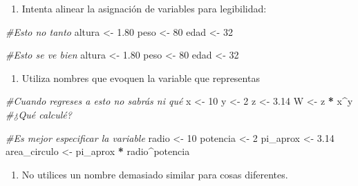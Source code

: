 \documentclass[
]{book}
\newenvironment{Shaded}{\begin{snugshade}}{\end{snugshade}}
\newcommand{\CommentTok}[1]{\textcolor[rgb]{0.56,0.35,0.01}{\textit{#1}}}
\newcommand{\DecValTok}[1]{\textcolor[rgb]{0.00,0.00,0.81}{#1}}
\newcommand{\FloatTok}[1]{\textcolor[rgb]{0.00,0.00,0.81}{#1}}
\newcommand{\NormalTok}[1]{#1}
\newcommand{\OperatorTok}[1]{\textcolor[rgb]{0.81,0.36,0.00}{\textbf{#1}}}
\newcommand{\StringTok}[1]{\textcolor[rgb]{0.31,0.60,0.02}{#1}}
\providecommand{\tightlist}{%
  \setlength{\itemsep}{0pt}\setlength{\parskip}{0pt}}
\begin{document}
\begin{enumerate}
\def\labelenumi{\arabic{enumi}.}
\setcounter{enumi}{2}
\tightlist
\item
  Intenta alinear la asignación de variables para legibilidad:
\end{enumerate}

\begin{Shaded}
\begin{Highlighting}[]
\CommentTok{#Esto no tanto}
\NormalTok{altura <-}\StringTok{ }\FloatTok{1.80}
\NormalTok{peso <-}\StringTok{ }\DecValTok{80}
\NormalTok{edad <-}\StringTok{ }\DecValTok{32}

\CommentTok{#Esto se ve bien}
\NormalTok{altura <-}\StringTok{ }\FloatTok{1.80}
\NormalTok{peso   <-}\StringTok{ }\DecValTok{80}
\NormalTok{edad   <-}\StringTok{ }\DecValTok{32}
\end{Highlighting}
\end{Shaded}

\begin{enumerate}
\def\labelenumi{\arabic{enumi}.}
\setcounter{enumi}{3}
\tightlist
\item
  Utiliza nombres que evoquen la variable que representas
\end{enumerate}

\begin{Shaded}
\begin{Highlighting}[]
\CommentTok{#Cuando regreses a esto no sabrás ni qué}
\NormalTok{x <-}\StringTok{ }\DecValTok{10}
\NormalTok{y <-}\StringTok{ }\DecValTok{2}
\NormalTok{z <-}\StringTok{ }\FloatTok{3.14}
\NormalTok{W <-}\StringTok{ }\NormalTok{z }\OperatorTok{*}\StringTok{ }\NormalTok{x}\OperatorTok{^}\NormalTok{y }\CommentTok{#¿Qué calculé?}

\CommentTok{#Es mejor especificar la variable}
\NormalTok{radio        <-}\StringTok{ }\DecValTok{10}
\NormalTok{potencia     <-}\StringTok{ }\DecValTok{2}
\NormalTok{pi_aprox     <-}\StringTok{ }\FloatTok{3.14}
\NormalTok{area_circulo <-}\StringTok{ }\NormalTok{pi_aprox }\OperatorTok{*}\StringTok{ }\NormalTok{radio}\OperatorTok{^}\NormalTok{potencia}
\end{Highlighting}
\end{Shaded}

\begin{enumerate}
\def\labelenumi{\arabic{enumi}.}
\setcounter{enumi}{4}
\tightlist
\item
  No utilices un nombre demasiado similar para cosas diferentes.
\end{enumerate}
\end{document}

